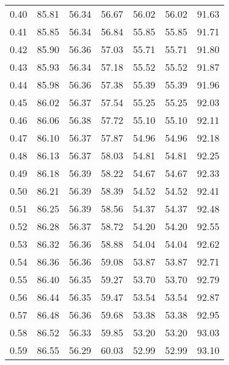 \begin{tabular}{|c|c|c|c|c|c|c|}
      0.40 &     85.81 &     56.34 &      56.67 &   56.02 &      56.02 &         91.63 \\
      0.41 &     85.85 &     56.34 &      56.84 &   55.85 &      55.85 &         91.71 \\
      0.42 &     85.90 &     56.36 &      57.03 &   55.71 &      55.71 &         91.80 \\
      0.43 &     85.93 &     56.34 &      57.18 &   55.52 &      55.52 &         91.87 \\
      0.44 &     85.98 &     56.36 &      57.38 &   55.39 &      55.39 &         91.96 \\
      0.45 &     86.02 &     56.37 &      57.54 &   55.25 &      55.25 &         92.03 \\
      0.46 &     86.06 &     56.38 &      57.72 &   55.10 &      55.10 &         92.11 \\
      0.47 &     86.10 &     56.37 &      57.87 &   54.96 &      54.96 &         92.18 \\
      0.48 &     86.13 &     56.37 &      58.03 &   54.81 &      54.81 &         92.25 \\
      0.49 &     86.18 &     56.39 &      58.22 &   54.67 &      54.67 &         92.33 \\
      0.50 &     86.21 &     56.39 &      58.39 &   54.52 &      54.52 &         92.41 \\
      0.51 &     86.25 &     56.39 &      58.56 &   54.37 &      54.37 &         92.48 \\
      0.52 &     86.28 &     56.37 &      58.72 &   54.20 &      54.20 &         92.55 \\
      0.53 &     86.32 &     56.36 &      58.88 &   54.04 &      54.04 &         92.62 \\
      0.54 &     86.36 &     56.36 &      59.08 &   53.87 &      53.87 &         92.71 \\
      0.55 &     86.40 &     56.35 &      59.27 &   53.70 &      53.70 &         92.79 \\
      0.56 &     86.44 &     56.35 &      59.47 &   53.54 &      53.54 &         92.87 \\
      0.57 &     86.48 &     56.36 &      59.68 &   53.38 &      53.38 &         92.95 \\
      0.58 &     86.52 &     56.33 &      59.85 &   53.20 &      53.20 &         93.03 \\
      0.59 &     86.55 &     56.29 &      60.03 &   52.99 &      52.99 &         93.10 \\

\end{tabular}
